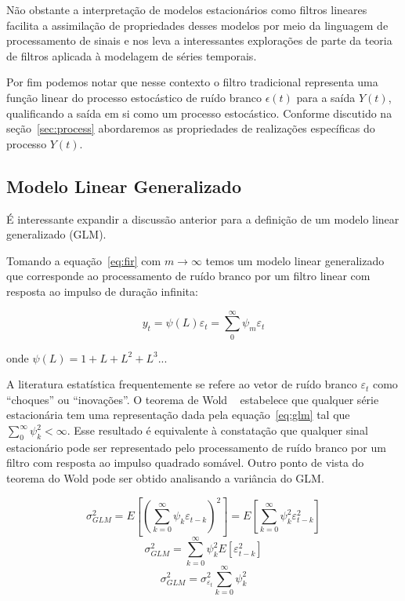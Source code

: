 Não obstante a interpretação de modelos estacionários como filtros lineares
facilita a assimilação de propriedades desses modelos por meio da linguagem de
processamento de sinais e nos leva a interessantes explorações de parte da
teoria de filtros aplicada à modelagem de séries temporais.

Por fim podemos notar que nesse contexto o filtro tradicional representa uma
função linear do processo estocástico de ruído branco ${\epsilon(t)}$ para a
saída ${Y(t)}$, qualificando a saída em si como um processo estocástico.
Conforme discutido na seção~\ref{sec:process} abordaremos as propriedades de
realizações específicas do processo ${Y(t)}$.



\subsection{Modelo Linear Generalizado}
\label{sec:glm}

É interessante expandir a discussão anterior para a definição de um modelo
linear generalizado (GLM).

Tomando a equação~\ref{eq:fir} com $m \rightarrow \infty$ temos um modelo linear
generalizado que corresponde ao processamento de ruído branco por um filtro
linear com resposta ao impulso de duração infinita:

\begin{equation}\label{eq:glm}
    y_t = \psi(L)\varepsilon_t = \sum^{\infty}_{0} \psi_m \varepsilon_t
\end{equation}

onde $\psi(L) = 1 + L + L^2 + L^3 ...$

A literatura estatística frequentemente se refere ao vetor de ruído branco
$\varepsilon_t$ como ``choques'' ou ``inovações''. O teorema de Wold
~\cite{wold} estabelece que qualquer série estacionária tem uma representação
dada pela equação~\ref{eq:glm} tal que $\sum^{\infty}_{0} \psi_k^2 < \infty$. Esse
resultado é equivalente à constatação que qualquer sinal estacionário pode ser
representado pelo processamento de ruído branco por um filtro com resposta ao
impulso quadrado somável. Outro ponto de vista do teorema do Wold pode ser
obtido analisando a variância do GLM.

$$\sigma^2_{GLM} = E\left[\left(\sum^{\infty}_{k=0} \psi_k \varepsilon_{t-k}\right)^2\right] = E\left[\sum^{\infty}_{k=0} \psi_k^2 \varepsilon_{t-k}^2\right]$$
$$\sigma^2_{GLM} = \sum^{\infty}_{k=0} \psi_k^2 E[\varepsilon_{t-k}^2]$$
$$\sigma^2_{GLM} = \sigma^2_{\varepsilon_t} \sum^{\infty}_{k=0} \psi_k^2 $$

